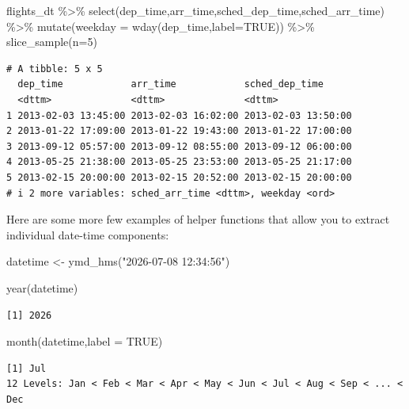 \documentclass[
  letterpaper,
  DIV=11,
  numbers=noendperiod]{scrartcl}
\newenvironment{Shaded}{\begin{snugshade}}{\end{snugshade}}
\newcommand{\AttributeTok}[1]{\textcolor[rgb]{0.40,0.45,0.13}{#1}}
\newcommand{\ConstantTok}[1]{\textcolor[rgb]{0.56,0.35,0.01}{#1}}
\newcommand{\DecValTok}[1]{\textcolor[rgb]{0.68,0.00,0.00}{#1}}
\newcommand{\FunctionTok}[1]{\textcolor[rgb]{0.28,0.35,0.67}{#1}}
\newcommand{\NormalTok}[1]{\textcolor[rgb]{0.00,0.23,0.31}{#1}}
\newcommand{\OtherTok}[1]{\textcolor[rgb]{0.00,0.23,0.31}{#1}}
\newcommand{\SpecialCharTok}[1]{\textcolor[rgb]{0.37,0.37,0.37}{#1}}
\newcommand{\StringTok}[1]{\textcolor[rgb]{0.13,0.47,0.30}{#1}}
\begin{document}
\begin{Shaded}
\begin{Highlighting}[]
\NormalTok{flights\_dt }\SpecialCharTok{\%\textgreater{}\%}
   \FunctionTok{select}\NormalTok{(dep\_time,arr\_time,sched\_dep\_time,sched\_arr\_time) }\SpecialCharTok{\%\textgreater{}\%}
  \FunctionTok{mutate}\NormalTok{(}\AttributeTok{weekday =} \FunctionTok{wday}\NormalTok{(dep\_time,}\AttributeTok{label=}\ConstantTok{TRUE}\NormalTok{)) }\SpecialCharTok{\%\textgreater{}\%}
  \FunctionTok{slice\_sample}\NormalTok{(}\AttributeTok{n=}\DecValTok{5}\NormalTok{)}
\end{Highlighting}
\end{Shaded}

\begin{verbatim}
# A tibble: 5 x 5
  dep_time            arr_time            sched_dep_time     
  <dttm>              <dttm>              <dttm>             
1 2013-02-03 13:45:00 2013-02-03 16:02:00 2013-02-03 13:50:00
2 2013-01-22 17:09:00 2013-01-22 19:43:00 2013-01-22 17:00:00
3 2013-09-12 05:57:00 2013-09-12 08:55:00 2013-09-12 06:00:00
4 2013-05-25 21:38:00 2013-05-25 23:53:00 2013-05-25 21:17:00
5 2013-02-15 20:00:00 2013-02-15 20:52:00 2013-02-15 20:00:00
# i 2 more variables: sched_arr_time <dttm>, weekday <ord>
\end{verbatim}

Here are some more few examples of helper functions that allow you to
extract individual date-time components:

\begin{Shaded}
\begin{Highlighting}[]
\NormalTok{datetime }\OtherTok{\textless{}{-}} \FunctionTok{ymd\_hms}\NormalTok{(}\StringTok{"2026{-}07{-}08 12:34:56"}\NormalTok{)}

\FunctionTok{year}\NormalTok{(datetime)}
\end{Highlighting}
\end{Shaded}

\begin{verbatim}
[1] 2026
\end{verbatim}

\begin{Shaded}
\begin{Highlighting}[]
\FunctionTok{month}\NormalTok{(datetime,}\AttributeTok{label =} \ConstantTok{TRUE}\NormalTok{)}
\end{Highlighting}
\end{Shaded}

\begin{verbatim}
[1] Jul
12 Levels: Jan < Feb < Mar < Apr < May < Jun < Jul < Aug < Sep < ... < Dec
\end{verbatim}
\end{document}
